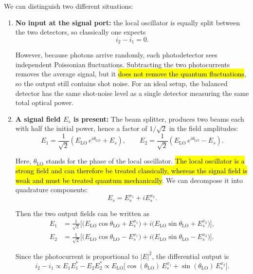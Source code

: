 We can distinguish two different situations:
\begin{enumerate}
    \item \textbf{No input at the signal port:} the local oscillator is equally split between the two detectors, so classically one expects
    \[
    i_2-i_1=0.
    \]

    However, because photons arrive randomly, each photodetector sees independent Poissonian fluctuations. Subtracting the two photocurrents removes the average signal, but it \hl{does not remove the quantum fluctuations}, so the output still contains shot noise. For an ideal setup, the balanced detector has the same shot-noise level as a single detector measuring the same total optical power.

    \item \textbf{A signal field $E_s$ is present:}
    The beam splitter, produces two beams each with half the initial power, hence a factor of $1/\sqrt{2}$ in the field amplitudes: 
    \begin{equation}\label{eqn:14-beam-splitter-fields}
    E_1=\frac{1}{\sqrt{2}}\left(E_\text{LO}\,e^{i\theta_\text{LO}}+E_s\right),
    \qquad
    E_2=\frac{1}{\sqrt{2}}\left(E_\text{LO}\,e^{i\theta_\text{LO}}-E_s\right).
    \end{equation}

    Here, $\theta_\text{LO}$ stands for the phase of the local oscillator. \hl{The local oscillator is a strong field and can therefore be treated classically, whereas the signal field is weak and must be treated quantum mechanically}. We can decompose it into quadrature components:
    \begin{equation}\label{eqn:14-signal-field-quadratures}
    E_s=E_s^{x_1}+iE_s^{x_2}.
    \end{equation}

    Then the two output fields can be written as
    \begin{align}
    E_1 &= \frac{1}{\sqrt{2}}
    \Big[
        \bigl(E_\text{LO}\cos\theta_\text{LO}+E_s^{x_1}\bigr)
        +i\bigl(E_\text{LO}\sin\theta_\text{LO}+E_s^{x_2}\bigr)
    \Big], \\[0.75ex]
    E_2 &= \frac{1}{\sqrt{2}}
    \Big[
        \bigl(E_\text{LO}\cos\theta_\text{LO}-E_s^{x_1}\bigr)
        +i\bigl(E_\text{LO}\sin\theta_\text{LO}-E_s^{x_2}\bigr)
    \Big].
    \end{align}

    Since the photocurrent is proportional to $|E|^2$, the differential output is
    \[
    i_2-i_1 \propto E_1E_1^*-E_2E_2^*
    \propto E_\text{LO}\Big[\cos(\theta_\text{LO})\,E_s^{x_1}
    +\sin(\theta_\text{LO})\,E_s^{x_2}\Big].
    \]


\end{enumerate}
